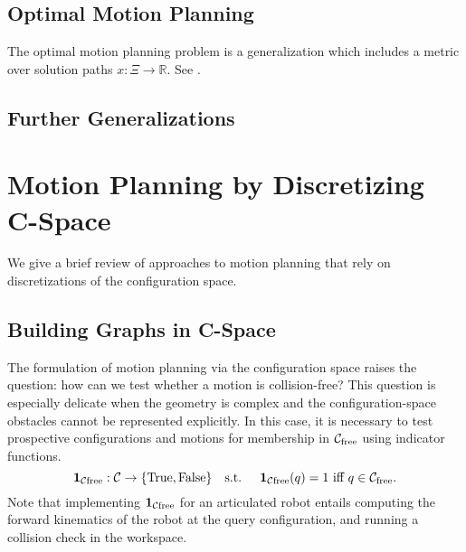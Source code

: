 \subsection{Optimal Motion Planning}

The optimal motion planning problem is a generalization which
includes a metric over solution paths
$x : \Xi \rightarrow \mathbb{R}$.
See \citep{karaman2011samplingoptimal}.

\subsection{Further Generalizations}


\section{Motion Planning by Discretizing C-Space}

We give a brief review of approaches to motion planning that rely
on discretizations of the configuration space.

\subsection{Building Graphs in C-Space}
\label{subsec:roadmaps:building-graphs}

The formulation of motion planning via the configuration space
raises the question:
how can we test whether a motion is collision-free?
This question is especially delicate when the geometry is complex
and the configuration-space obstacles cannot be represented explicitly.
In this case,
it is necessary to test prospective configurations and motions
for membership in $\mathcal{C}_{\mbox{\scriptsize free}}$ using indicator functions.
\begin{equation}
   \mathbf{1}_{\mathcal{C}\mbox{\scriptsize free}} : \mathcal{C} \rightarrow \{ \mbox{True}, \mbox{False} \} 
   \mbox{\quad s.t. \quad}
   \mathbf{1}_{\mathcal{C}\mbox{\scriptsize free}}(q) = 1 \mbox{ iff } q \in \mathcal{C}_{\mbox{\scriptsize free}}.
\end{equation}
Note that implementing $\mathbf{1}_{\mathcal{C}\mbox{\scriptsize free}}$ for an articulated robot
entails computing the forward kinematics of the robot at the
query configuration,
and running a collision check in the workspace.

